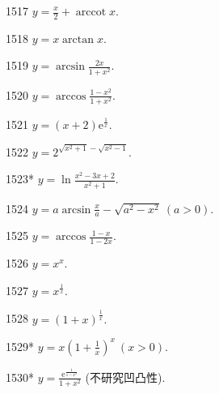\begin{prob}[S]{1517}
$y = \frac{x}{2} + \operatorname{arccot} x.$
\end{prob}

\begin{prob}[S]{1518}
$y = x\arctan x.$
\end{prob}

\begin{prob}[S]{1519}
$y = \arcsin\frac{2x}{1 + x^2}.$
\end{prob}

\begin{prob}[S]{1520}
$y = \arccos\frac{1 - x^2}{1 + x^2}.$
\end{prob}

\begin{prob}[S]{1521}
$y = (x+2)\mathrm{e}^{\frac{1}{x}}.$
\end{prob}

\begin{prob}[S]{1522}
$y = 2^{\sqrt{x^2+1} - \sqrt{x^2-1}}.$
\end{prob}

\begin{prob}[S]{1523*}
$y = \ln\frac{x^2 - 3x + 2}{x^2 + 1}.$
\end{prob}

\begin{prob}[S]{1524}
$y = a\arcsin\frac{x}{a} - \sqrt{a^2 - x^2}\ (a > 0).$
\end{prob}

\begin{prob}[S]{1525}
$y = \arccos\frac{1 - x}{1 - 2x}.$
\end{prob}

\begin{prob}[S]{1526}
$y = x^x.$
\end{prob}

\begin{prob}[S]{1527}
$y = x^{\frac{1}{x}}.$
\end{prob}

\begin{prob}[S]{1528}
$y = (1 + x)^{\frac{1}{x}}.$
\end{prob}

\begin{prob}[S]{1529*}
$y = x\left(1 + \frac{1}{x}\right)^x\ (x > 0).$
\end{prob}

\begin{prob}[S]{1530*}
$y = \frac{\mathrm{e}^{\frac{1}{1 - x^2}}}{1 + x^2}$ (不研究凹凸性).
\end{prob}

